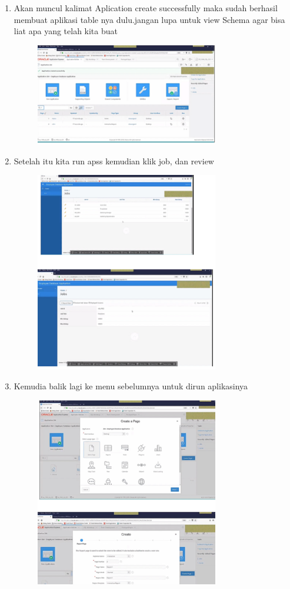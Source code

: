 \documentclass{article}
\begin{document}
\begin{enumerate}
\begin{enumerate}
\begin{enumerate}
\begin{enumerate}
\begin{figure}[h]
    \end{figure}
    \item Akan muncul kalimat Aplication create successfully maka sudah berhasil membuat aplikasi table nya dulu.jangan lupa untuk view Schema agar bisa liat apa yang telah kita buat
    \begin{figure}[h]
        \centerline{\includegraphics[width=8cm]{image/m.PNG}}
    \end{figure}
    \newpage \item Setelah itu kita run apss kemudian klik job, dan review
    \begin{figure}[h]
        \centerline{\includegraphics[width=8cm]{image/n.PNG}}
    \end{figure}
    \newpage \item Kemudia balik lagi ke menu sebelumnya untuk dirun aplikasinya
    \begin{figure}[h]
        \centerline{\includegraphics[width=8cm]{image/o.PNG}}

\end{figure}
\end{enumerate}
\end{enumerate}
\end{enumerate}
\end{enumerate}
\end{document}
